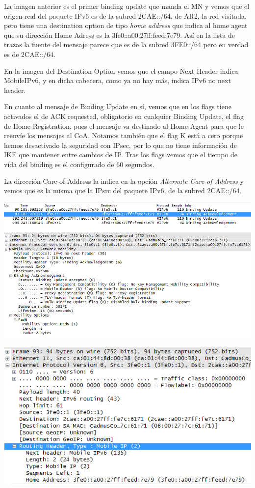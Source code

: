 \documentclass{article}
\begin{document}
La imagen anterior es el primer binding update que manda el MN y vemos que el origen real del paquete IPv6 es de la subred 2CAE::/64, de AR2, la red visitada, pero tiene una destination option de tipo \textit{home address} que indica al home agent que su dirección Home Adress es la 3fe0::a00:27ff:feed:7e79. Así en la lista de trazas la fuente del mensaje parece que es de la subred 3FE0::/64 pero en verdad es de 2CAE::/64.

En la imagen del Destination Option vemos que el campo Next Header indica MobileIPv6, y en dicha cabecera, como ya no hay más, indica IPv6 no next header.

En cuanto al mensaje de Binding Update en sí, vemos que en los flags tiene activados el de ACK requested, obligatorio en cualquier Binding Update, el flag de Home Registration, pues el mensaje va destinado al Home Agent para que le reenvíe los mensajes al CoA. Notamos también que el flag K está a cero porque hemos desactivado la seguridad con IPsec, por lo que no tiene información de IKE que mantener entre cambios de IP. Tras los flags vemos que el tiempo de vida del binding es el configurado de 60 segundos.

La dirección Care-of Address la indica en la opción \textit{Alternate Care-of Address} y vemos que es la misma que la IPsrc del paquete IPv6, de la subred 2CAE::/64.

\begin{center} 
	\includegraphics[scale=0.7]{images/bindACK.png}
\end{center}

\begin{center} 
	\includegraphics[scale=0.7]{images/bindRoutHead.png}
\end{center}
\end{document}

